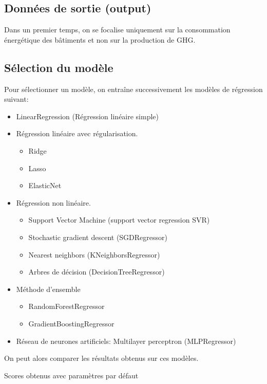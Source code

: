 \subsection{Données de sortie (output)}

Dans un premier temps, on se focalise uniquement sur la consommation énergétique
des bâtiments et non sur la production de GHG.

\subsection{Sélection du modèle}

Pour sélectionner un modèle, on entraîne successivement les modèles de
régression suivant:
\begin{itemize}
  \item LinearRegression (Régression linéaire simple)
  \item Régression linéaire avec régularisation.
  \begin{itemize}
    \item Ridge \cite{Marquardt1975}
    \item Lasso \cite{tibshirani96regression}
    \item ElasticNet
  \end{itemize}
  \item Régression non linéaire.
  \begin{itemize}
    \item Support Vector Machine (support vector regression SVR)
    \item Stochastic gradient descent (SGDRegressor)
    \item Nearest neighbors (KNeighborsRegressor)
    \item Arbres de décision (DecisionTreeRegressor)
  \end{itemize}
  \item Méthode d'ensemble
  \begin{itemize}
    \item RandomForestRegressor
    \item GradientBoostingRegressor
  \end{itemize}
  \item Réseau de neurones artificiels: Multilayer perceptron (MLPRegressor)
\end{itemize}

On peut alors comparer les résultats obtenus sur ces modèles.
\begin{table}[H]
  
  \caption{Scores obtenus avec paramètres par défaut}
  \label{}
\end{table}

